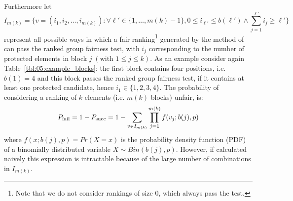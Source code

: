 \noindent Furthermore let
\begin{equation}
	\label{eq:05:combinations}
	I_{m(k)} = \{ v = (i_1, i_2, \ldots, i_{m(k)}): \forall \ell' \in \lbrace 1,\ldots,m(k) -1 \rbrace, 0 \le i_{\ell'} \le b(\ell') \wedge \sum_{j=1}^{\ell'} i_j \ge \ell' \}
\end{equation}
%
represent all possible ways in which a fair ranking\footnote{Note that we do not consider rankings of size 0, which always pass the test.} generated by the method of \citet{yang2016measuring} can pass the ranked group fairness test, with $i_j$ corresponding to the number of protected elements in block $j \; (\text{with } 1 \le j \le k)$.
%
As an example consider again Table~\ref{tbl:05:example_blocks}: the first block contains four positions, i.e. $b(1)=4$ and this block passes the ranked group fairness test, if it contains at least one protected candidate, hence $i_1 \in \{1, 2, 3, 4\}$.
%
The probability of considering a ranking of $k$ elements (i.e. $m(k)$ blocks) unfair, is:
\begin{equation}
	\label{eq:05:failureProb}
	P_{\operatorname{fail}} = 1 - P_{\operatorname{succ}} = 1 - \sum_{v \in I_{m(k)}} \prod_{j=1}^{m(k)} f(v_j; b(j), p)
\end{equation}
%
\noindent where $f(x;b(j),p) = Pr(X = x)$ is the probability density function (PDF) of a binomially distributed variable $X \sim Bin(b(j), p)$.
%
However, if calculated naively this expression is intractable because of the large number of combinations in $I_{m(k)}$.
%

